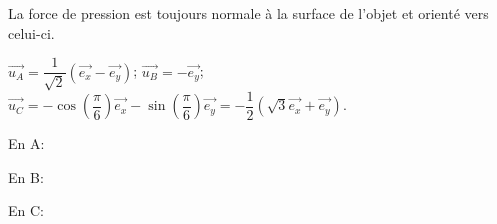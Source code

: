 \begin{corrige}
La force de pression est toujours normale à la surface de l'objet
et orienté vers celui-ci.

$\vec{u_{A}}=\dfrac{1}{\sqrt{2}}\left(\vec{e_{x}}-\vec{e_{y}}\right)$;
$\vec{u_{B}}=-\vec{e_{y}}$;
$\vec{u_{C}}=-\cos\left(\dfrac{\pi}{6}\right)\vec{e_{x}}-\sin\left(\dfrac{\pi}{6}\right)\vec{e_{y}}=-\dfrac{1}{2}\left(\sqrt{3}\vec{e_{x}}+\vec{e_{y}}\right)$.

\end{corrige}

\debutEntrainement



\begin{enonce}
En A:
\end{enonce}
%
\begin{enonce}
En B:
\end{enonce}
%
\begin{enonce}
En C:
\end{enonce}
%


\finEntrainement










\hauteurLargeurCadreReponse		{8mm}{1.5cm}
\initialisationEntrainement

